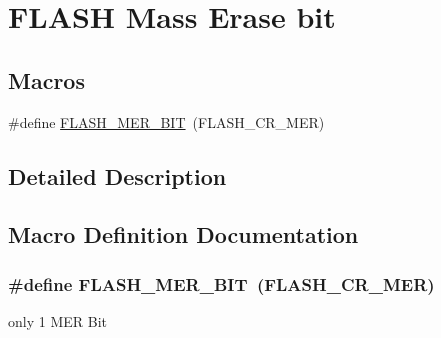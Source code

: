 \hypertarget{group___f_l_a_s_h_ex___mass_erase__bit}{}\section{F\+L\+A\+SH Mass Erase bit}
\label{group___f_l_a_s_h_ex___mass_erase__bit}
\subsection*{Macros}
\begin{DoxyCompactItemize}
\item 
\#define \hyperlink{group___f_l_a_s_h_ex___mass_erase__bit_gae8edecf268bc993ff286fa1fabb486dd}{F\+L\+A\+S\+H\+\_\+\+M\+E\+R\+\_\+\+B\+IT}~(F\+L\+A\+S\+H\+\_\+\+C\+R\+\_\+\+M\+ER)
\end{DoxyCompactItemize}


\subsection{Detailed Description}


\subsection{Macro Definition Documentation}
\subsubsection[{\texorpdfstring{F\+L\+A\+S\+H\+\_\+\+M\+E\+R\+\_\+\+B\+IT}{FLASH_MER_BIT}}]{\setlength{\rightskip}{0pt plus 5cm}\#define F\+L\+A\+S\+H\+\_\+\+M\+E\+R\+\_\+\+B\+IT~(F\+L\+A\+S\+H\+\_\+\+C\+R\+\_\+\+M\+ER)}\hypertarget{group___f_l_a_s_h_ex___mass_erase__bit_gae8edecf268bc993ff286fa1fabb486dd}{}\label{group___f_l_a_s_h_ex___mass_erase__bit_gae8edecf268bc993ff286fa1fabb486dd}
only 1 M\+ER Bit 